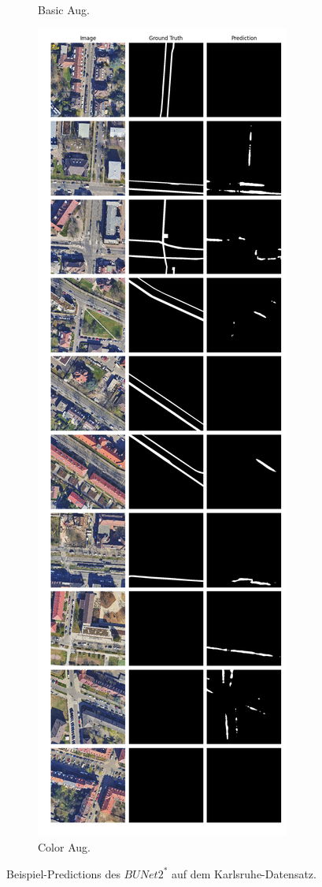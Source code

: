 \begin{figure}
\begin{subfigure}{.4\textwidth}
		\caption{Basic Aug.}
	\end{subfigure}
	\begin{subfigure}{.4\textwidth}
		\centering
		\includegraphics[width=1.\textwidth]{Bilder/karlsruhe-color-samples/bunet2-s.png}
		\caption{Color Aug.}
	\end{subfigure}
	\caption{Beispiel-Predictions des $BUNet2^*$ auf dem Karlsruhe-Datensatz.}
	\label{fig:ka-samples-bunet2-s}
	\end{figure}
	
